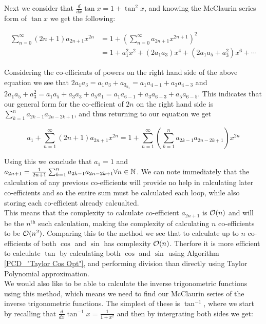 {Next we consider that \(\frac{d}{dx} \tan x = 1 + \tan^2 x\), and knowing the McClaurin series form of \(\tan x\) we get the following:

\begin{displaymath}
\begin{align*}
	\sum_{n=0}^\infty (2n+1)a_{2n+1}x^{2n} &= 1 + 
		(\sum_{n=0}^\infty a_{2n+1}x^{2n+1})^2\\
	&= 1 + a_1^2x^2 + (2a_1a_3)x^4 + (2a_1a_5 + a_3^2)x^6 + \cdots
\end{align*}
\end{displaymath}

Considering the co-efficients of powers on the right hand side of the above equation we see that \(2a_1a_3 = a_1a_3 + a_3_a_1 = a_1a_{4-1} + a_3a_{4-3}\) and \(2a_1a_5 + a_3^2 = a_1a_5 + a_3a_3 + a_5a_1 = a_1a_{6-1} + a_3a_{6-3} +a_5a_{6-5}\). This indicates that our general form for the co-efficient of \(2n\) on the right hand side is \(\sum_{k=1}^n a_{2k-1}a_{2n - 2k + 1}\), and thus returning to our equation we get

\[a_1 + \sum_{n=1}^\infty (2n+1)a_{2n+1}x^{2n} = 1 + \sum_{n=1}^\infty(\sum_{k=1}^n a_{2k-1}a_{2n-2k+1})x^{2n}\]

Using this we conclude that \(a_1 = 1\) and \(a_{2n+1} = \frac{1}{2n+1}\sum_{k=1}^n a_{2k-1}a_{2n-2k+1} \forall n \in \mathbb{N}\). We can note immediately that the calculation of any previous co-efficients will provide no help in calculating later co-efficients and so the entire sum must be calculated each loop, while also storing each co-efficient already calcualted.\\

This means that the complexity to calculate co-efficient \(a_{2n+1}\) is \(\mathcal{O}(n)\) and will be the \(n^\text{th}\) such calculation, making the complexity of calculating \(n\) co-efficients to be \(\mathcal{O}(n^2)\). Comparing this to the  method we see that to calculate up to \(n\) co-efficients of both \(\cos\) and \(\sin\) has complexity \(\mathcal{O}(n)\). Therfore it is more efficient to calculate \(\tan\) by calculating both \(\cos\) and \(\sin\) using Algorithm \ref{PCD_"Taylor Cos Opt"}, and performing division than directly using Taylor Polynomial approximation.\\

We would also like to be able to calculate the inverse trigonometric functions using this method, which means we need to find our McClaurin series of the inverse trigonometric functions. The simplest of these is \(\tan^{-1}\), where we start by recalling that \(\frac{d}{dx} \tan^{-1} x = \frac{1}{1+x^2}\) and then by intergrating both sides we get:

}
